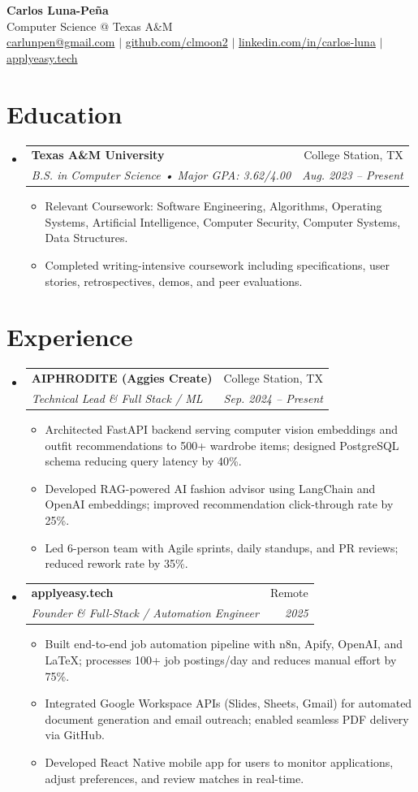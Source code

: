 \documentclass[letterpaper,11pt]{article}
\makeatletter
\newcommand{\resumeItem}[1]{
  \item\small{{#1 \vspace{-2pt}}}
}
\newcommand{\resumeSubheading}[4]{
  \vspace{-2pt}\item
    \begin{tabular*}{0.97\textwidth}[t]{l@{\extracolsep{\fill}}r}
      \textbf{#1} & #2 \\
      \textit{\small#3} & \textit{\small #4} \\
    \end{tabular*}\vspace{-7pt}
}
\newcommand{\resumeSubHeadingListStart}{\begin{itemize}[leftmargin=0.15in, label={}]}
\newcommand{\resumeSubHeadingListEnd}{\end{itemize}}
\newcommand{\resumeItemListStart}{\begin{itemize}}
\newcommand{\resumeItemListEnd}{\end{itemize}\vspace{-5pt}}
\makeatother
\begin{document}
\begin{center}
  \textbf{\Huge Carlos Luna-Pe\~na} \\
  \vspace{1pt}
  Computer Science @ Texas A\&M \\
  \vspace{1pt}
  \href{mailto:carlunpen@gmail.com}{carlunpen@gmail.com} $|$
  \href{https://github.com/clmoon2}{github.com/clmoon2} $|$
  \href{https://linkedin.com/in/carlos-luna}{linkedin.com/in/carlos-luna} $|$
  \href{https://applyeasy.tech}{applyeasy.tech}
\end{center}

\section{Education}
\resumeSubHeadingListStart
  \resumeSubheading
    {Texas A\&M University}{College Station, TX}
    {B.S. in Computer Science • Major GPA: 3.62/4.00}{Aug. 2023 -- Present}
    \resumeItemListStart
      \resumeItem{Relevant Coursework: Software Engineering, Algorithms, Operating Systems, Artificial Intelligence, Computer Security, Computer Systems, Data Structures.}
      \resumeItem{Completed writing-intensive coursework including specifications, user stories, retrospectives, demos, and peer evaluations.}
    \resumeItemListEnd
\resumeSubHeadingListEnd

\section{Experience}
\resumeSubHeadingListStart
  \resumeSubheading
    {AIPHRODITE (Aggies Create)}{College Station, TX}
    {Technical Lead \& Full Stack / ML}{Sep. 2024 -- Present}
    \resumeItemListStart
      \resumeItem{Architected FastAPI backend serving computer vision embeddings and outfit recommendations to 500+ wardrobe items; designed PostgreSQL schema reducing query latency by 40\%.}
      \resumeItem{Developed RAG-powered AI fashion advisor using LangChain and OpenAI embeddings; improved recommendation click-through rate by 25\%.}
      \resumeItem{Led 6-person team with Agile sprints, daily standups, and PR reviews; reduced rework rate by 35\%.}
    \resumeItemListEnd

  \resumeSubheading
    {applyeasy.tech}{Remote}
    {Founder \& Full-Stack / Automation Engineer}{2025}
    \resumeItemListStart
      \resumeItem{Built end-to-end job automation pipeline with n8n, Apify, OpenAI, and LaTeX; processes 100+ job postings/day and reduces manual effort by 75\%.}
      \resumeItem{Integrated Google Workspace APIs (Slides, Sheets, Gmail) for automated document generation and email outreach; enabled seamless PDF delivery via GitHub.}
      \resumeItem{Developed React Native mobile app for users to monitor applications, adjust preferences, and review matches in real-time.}
    \resumeItemListEnd
\resumeSubHeadingListEnd
\end{document}
